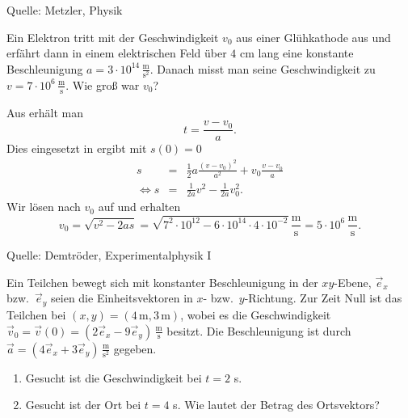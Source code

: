 \begin{MExercises}
\begin{MExercise}
\begin{MSolution}
     \end{MSolution}
     
     Quelle: Metzler, Physik
     \end{MExercise}
     
     \begin{MExercise}
     Ein Elektron tritt mit der Geschwindigkeit $v_0$ aus einer Gl\"uhkathode aus und erf\"ahrt dann in einem elektrischen Feld \"uber $4$ cm lang eine konstante Beschleunigung $a=3\cdot 10^{14}\,\frac{\text{m}}{\text{s}^2}$. Danach misst man seine Geschwindigkeit zu $v=7\cdot 10^6 \,\frac{\text{m}}{\text{s}}$. Wie gro{\ss} war $v_0$?
     
     \begin{MSolution} Aus  erh\"alt man 
     $$
     t=\frac{v-v_0}{a}.
     $$
     Dies eingesetzt in  ergibt mit $s(0)=0$
     \begin{eqnarray*}
     s&=&\frac{1}{2}a\frac{(v-v_0)^2}{a^2}+v_0\frac{v-v_0}{a}\\
     \Leftrightarrow s&=&\frac{1}{2a}v^2-\frac{1}{2a}v_0^2.
     \end{eqnarray*}
     Wir l\"osen nach $v_0$ auf und erhalten 
     $$
     v_0=\sqrt{v^2-2as}=\sqrt{7^2\cdot 10^{12}-6\cdot 10^{14}\cdot4\cdot10^{-2}}\,\frac{\text{m}}{\text{s}}=5\cdot 10^{6}\,\frac{\text{m}}{\text{s}}.
     $$
     
     \end{MSolution}
     
     Quelle: Demtr\"oder, Experimentalphysik I
     \end{MExercise}
     

     \begin{MExercise}
     Ein Teilchen bewegt sich mit konstanter Beschleunigung in der $xy$-Ebene, $\vec{e}_x$ bzw.~$\vec{e}_y$ seien die Einheitsvektoren in $x$- bzw.~$y$-Richtung. Zur Zeit Null ist das Teilchen bei $(x,y)=(4\,\text{m},3\,\text{m})$, wobei es die Geschwindigkeit $\vec{v}_0=\vec{v}(0)=(2\vec{e}_x-9\vec{e}_y)\,\frac{\text{m}}{\text{s}}$ besitzt. Die Beschleunigung ist durch $\vec{a}=(4\vec{e}_x+3\vec{e}_y)\,\frac{\text{m}}{\text{s}^2}$ gegeben.
     \begin{enumerate}
     \item Gesucht ist die Geschwindigkeit bei $t=2$ s.
     \item Gesucht ist der Ort bei $t=4$ s. Wie lautet der Betrag des Ortsvektors?
     \end{enumerate}
     

\end{MExercise}
\end{MExercises}
